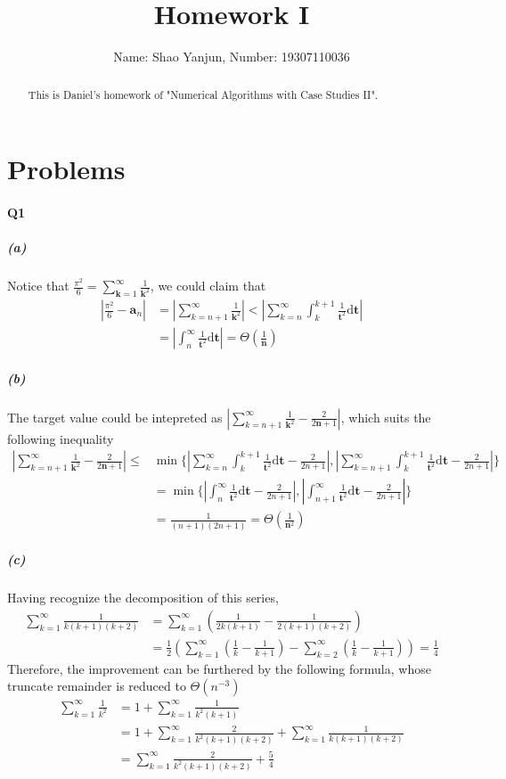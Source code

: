 \documentclass[11pt]{article}
\title{Homework I}
\author{Name: Shao Yanjun, Number: 19307110036}
\begin{document}
\maketitle
\begin{abstract}
This is Daniel's homework of  "Numerical Algorithms with Case Studies II".
\end{abstract}
\section{Problems}
\paragraph{Q1}
\subparagraph{(a)}
Notice that $\frac{\pi^2}{6}=\sum_{\mathbf{k}=1}^{\infty}\frac{1}{\mathbf{k}^2}$, we could claim that
\begin{align}
	|\frac{\pi^2}{6}-\mathbf{a}_n|&=|\sum_{k=n+1}^{\infty}\frac{1}{\mathbf{k}^2}|<
	|\sum_{k=n}^{\infty}\int_{k}^{k+1}\frac{1}{\mathbf{t}^2}\mathrm{d}\mathbf{t}|\\
	&=|\int_{n}^{\infty}\frac{1}{\mathbf{t}^2}\mathrm{d}\mathbf{t}|=\Theta(\frac{1}{\mathbf{n}})
\end{align}
\subparagraph{(b)}
The target value could be intepreted as $|\sum_{k=n+1}^{\infty}\frac{1}{\mathbf{k}^2}
-\frac{2}{2\mathbf{n}+1}|$, which suits the following inequality
\begin{align}
	|\sum_{k=n+1}^{\infty}\frac{1}{\mathbf{k}^2}
	-\frac{2}{2\mathbf{n}+1}| \le& 
	\min\{|\sum_{k=n}^{\infty}\int_{k}^{k+1}\frac{1}{\mathbf{t}^2}\mathrm{d}\mathbf{t}
		-\frac{2}{2n+1}|,
		|\sum_{k=n+1}^{\infty}\int_{k}^{k+1}\frac{1}{\mathbf{t}^2}\mathrm{d}\mathbf{t}
		-\frac{2}{2n+1}|\}\\
	&=\min\{|\int_{n}^{\infty}\frac{1}{\mathbf{t}^2}\mathrm{d}\mathbf{t}-\frac{2}{2n+1}|, |\int_{n+1}^{\infty}\frac{1}{\mathbf{t}^2}\mathrm{d}\mathbf{t}-\frac{2}{2n+1}|\}\\
	&= \frac{1}{(n+1)(2n+1)}=\Theta(\frac{1}{\mathbf{n}^2})	
\end{align}
\subparagraph{(c)}
Having recognize the decomposition of this series,
\begin{align}
	\sum_{k=1}^{\infty}\frac{1}{k(k+1)(k+2)}
	&=\sum_{k=1}^{\infty}(\frac{1}{2k(k+1)}-\frac{1}{2(k+1)(k+2)})\\
	&=\frac{1}{2}(\sum_{k=1}^{\infty}(\frac{1}{k}-\frac{1}{k+1})-\sum_{k=2}^{\infty}(\frac{1}{k}-\frac{1}{k+1}))=\frac{1}{4}
\end{align}
Therefore, the improvement can be furthered by the following formula, whose truncate remainder is reduced to $\Theta(n^{-3})$
\begin{align}
	\sum_{k=1}^{\infty}\frac{1}{k^2}&=1+\sum_{k=1}^{\infty}\frac{1}{k^2(k+1)}\\&=1+\sum_{k=1}^{\infty}\frac{2}{k^2(k+1)(k+2)}+\sum_{k=1}^{\infty}\frac{1}{k(k+1)(k+2)}\\
	&=\sum_{k=1}^{\infty}\frac{2}{k^2(k+1)(k+2)}+\frac{5}{4}
\end{align}
\end{document}
